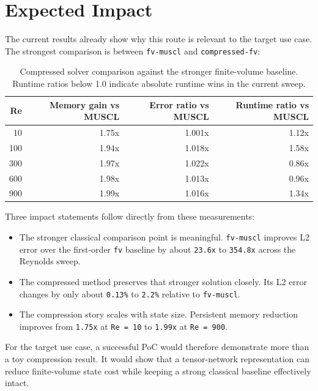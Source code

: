 \documentclass[11pt,a4paper]{article}
\begin{document}
\section{Expected Impact}

The current results already show why this route is relevant to the target use case. The strongest comparison is between \texttt{fv-muscl} and \texttt{compressed-fv}:

\begin{table}[H]
\centering
\small
\begin{tabular}{@{}rrrr@{}}
\toprule
Re & Memory gain vs MUSCL & Error ratio vs MUSCL & Runtime ratio vs MUSCL \\
\midrule
10  & 1.75x & 1.001x & 1.12x \\
100 & 1.94x & 1.018x & 1.58x \\
300 & 1.97x & 1.022x & 0.86x \\
600 & 1.98x & 1.013x & 0.96x \\
900 & 1.99x & 1.016x & 1.34x \\
\bottomrule
\end{tabular}
\caption{Compressed solver comparison against the stronger finite-volume baseline. Runtime ratios below 1.0 indicate absolute runtime wins in the current sweep.}
\end{table}

Three impact statements follow directly from these measurements:

\begin{itemize}
\item The stronger classical comparison point is meaningful. \texttt{fv-muscl} improves L2 error over the first-order \texttt{fv} baseline by about \texttt{23.6x} to \texttt{354.8x} across the Reynolds sweep.
\item The compressed method preserves that stronger solution closely. Its L2 error changes by only about \texttt{0.13\%} to \texttt{2.2\%} relative to \texttt{fv-muscl}.
\item The compression story scales with state size. Persistent memory reduction improves from \texttt{1.75x} at \texttt{Re = 10} to \texttt{1.99x} at \texttt{Re = 900}.
\end{itemize}

For the target use case, a successful PoC would therefore demonstrate more than a toy compression result. It would show that a tensor-network representation can reduce finite-volume state cost while keeping a strong classical baseline effectively intact.
\end{document}
